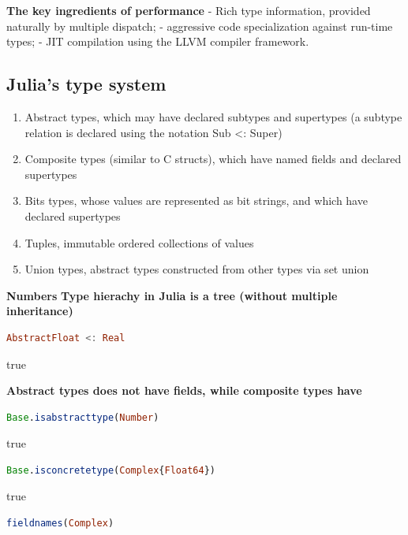 \documentclass[
  notoc %
]{tufte-book}
\providecommand{\tightlist}{%
  \setlength{\itemsep}{0pt}\setlength{\parskip}{0pt}
}
\begin{document}
\textbf{The key ingredients of performance} - Rich type information,
provided naturally by multiple dispatch; - aggressive code
specialization against run-time types; - JIT compilation using the LLVM
compiler framework.

\hypertarget{julias-type-system}{%
\subsection{Julia's type system}\label{julias-type-system}}

\begin{enumerate}
\def\labelenumi{\arabic{enumi}.}
\tightlist
\item
  Abstract types, which may have declared subtypes and supertypes (a
  subtype relation is declared using the notation Sub \textless: Super)
\item
  Composite types (similar to C structs), which have named fields and
  declared supertypes
\item
  Bits types, whose values are represented as bit strings, and which
  have declared supertypes
\item
  Tuples, immutable ordered collections of values
\item
  Union types, abstract types constructed from other types via set union
\end{enumerate}

\textbf{Numbers} \textbf{Type hierachy in Julia is a tree (without
multiple inheritance)}

\begin{lstlisting}[language=Julia]
AbstractFloat <: Real
\end{lstlisting}

true

\textbf{Abstract types does not have fields, while composite types have}

\begin{lstlisting}[language=Julia]
Base.isabstracttype(Number)
\end{lstlisting}

true

\begin{lstlisting}[language=Julia]
Base.isconcretetype(Complex{Float64})
\end{lstlisting}

true

\begin{lstlisting}[language=Julia]
fieldnames(Complex)
\end{lstlisting}
\end{document}
